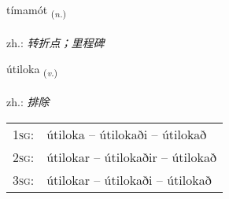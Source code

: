 \documentclass[frontgrid, backgrid]{flacards}\usepackage[]{graphicx}\usepackage[]{xcolor}
\begin{document}
\renewcommand{\flhead}{\vskip5pt \fboxsep=0pt {\small\bfseries\footnotesize Nafnorð | 名词}}
\renewcommand{\fcfoot}{\vskip5pt \fboxsep=0pt \hspace{2pt}{\small\bfseries\footnotesize 3K}}

\renewcommand{\blhead}{\vskip5pt {\small\bfseries\footnotesize Nafnorð | 名词 }}
\renewcommand{\bcfoot}{\vskip5pt \hspace{2pt}{\small\bfseries\footnotesize 3K}}


{tímamót \small{\textsubscript{(\textit{n.})}} \\[1ex] %
\textphonetic{[tʰiːmamout]} \\
zh.: \emph{转折点；里程碑} \\  [2ex]
\renewcommand*{\arraystretch}{0.8}
}

\renewcommand{\flhead}{\vskip5pt \fboxsep=0pt {\small\bfseries\footnotesize Sagnorð | 动词}}
\renewcommand{\fcfoot}{\vskip5pt \fboxsep=0pt \hspace{2pt}{\small\bfseries\footnotesize 3K}}

\renewcommand{\blhead}{\vskip5pt {\small\bfseries\footnotesize Sagnorð | 动词 }}
\renewcommand{\bcfoot}{\vskip5pt \hspace{2pt}{\small\bfseries\footnotesize 3K}}


{útiloka \small{\textsubscript{(\textit{v.})}} \\[1ex] %
\textphonetic{[uːtɪlɔka]} \\
zh.: \emph{排除} \\  [2ex]
\renewcommand*{\arraystretch}{0.8}
\begin{tabular}{p{1cm}l}
\textsc{1sg}: & útiloka -- útilokaði -- útilokað \\ 
\textsc{2sg}: & útilokar -- útilokaðir -- útilokað \\ 
\textsc{3sg}: & útilokar -- útilokaði -- útilokað \\ 
\end{tabular}
}
\end{document}
